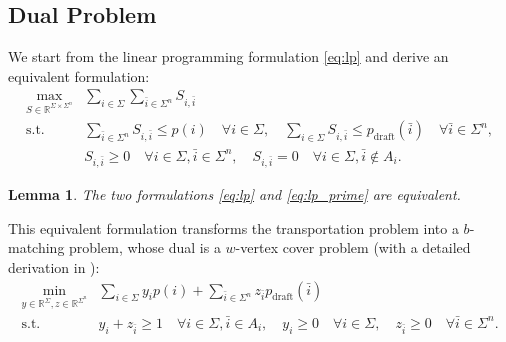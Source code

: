 \documentclass{article}
\makeatletter
\newcommand{\myvspace}{\@ifstar\myvspacestar\myvspacenostar}
\newcommand{\myvspacenostar}[1]{}
\newcommand{\myvspacestar}[1]{}
\newcommand{\crvspace}{\@ifstar\crvspacestar\crvspacenostar}
\newcommand{\crvspacenostar}[1]{}
\newcommand{\crvspacestar}[1]{}
\newtheorem{lemma}[theorem]{Lemma}
\makeatother
\begin{document}
\myvspace{-9pt}
\crvspace{-18pt}
\myvspace{-9pt}
\crvspace{-9pt}
\subsection{Dual Problem}
\myvspace{-4pt}
\crvspace{-4pt}
We start from the linear programming formulation \eqref{eq:lp} and derive an equivalent formulation:
\myvspace{-1pt}
\crvspace{-4pt}
\begin{equation}\label{eq:lp_prime}
\begin{aligned}
\max_{S \in \mathbb{R}^{\Sigma \times \Sigma^n}} & \sum_{i \in \Sigma} \sum_{\bar{i} \in \Sigma^n} S_{i,\bar{i}} \\
\text{s.t.~} & \sum_{\bar{i} \in \Sigma^n} S_{i,\bar{i}} \leq p(i) \quad\forall i \in \Sigma, \quad \sum_{i \in \Sigma} S_{i,\bar{i}} \leq p_{\text{draft}}(\bar{i}) \quad\forall \bar{i} \in \Sigma^n, \\
& S_{i,\bar{i}} \geq 0 \quad\forall i \in \Sigma, \bar{i} \in \Sigma^n, \quad S_{i,\bar{i}} = 0 \quad\forall i \in \Sigma, \bar{i} \notin A_i.
\end{aligned}
\end{equation}

\begin{lemma}\label{le:eq_lp_lp_prime}
    The two formulations \eqref{eq:lp} and \eqref{eq:lp_prime} are equivalent.
\end{lemma}
\myvspace{-8pt}
\crvspace{-8pt}
This equivalent formulation transforms the transportation problem \citep{hitchcock1941distribution} into a $b$-matching problem, whose dual is a $w$-vertex cover problem \citep{schrijver2003combinatorial} (with a detailed derivation in ):
\myvspace{-8pt}
\crvspace{-3pt}
\begin{equation}\label{eq:dual}
\begin{aligned}
\min_{y \in \mathbb{R}^{\Sigma}, z \in \mathbb{R}^{\Sigma^n}} &
\sum_{i \in \Sigma} y_i p(i) + \sum_{\bar{i} \in \Sigma^n} z_{\bar{i}} p_{\text{draft}}(\bar{i}) 
\\
\text{s.t.~} & y_i + z_{\bar{i}} \geq 1 \quad \forall i \in \Sigma, \bar{i} \in A_i,\quad y_i \geq 0 \quad \forall i \in \Sigma, \quad z_{\bar{i}} \geq 0 \quad \forall \bar{i} \in \Sigma^n.
\end{aligned}
\end{equation}

\myvspace{-15pt}
\crvspace{-15pt}
\end{document}
